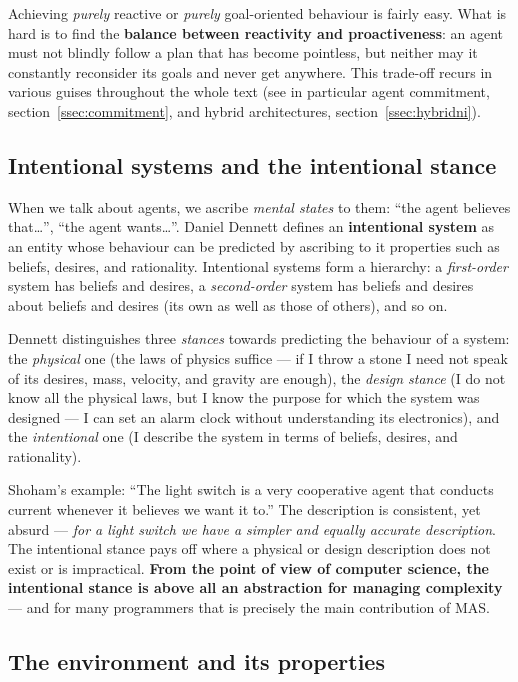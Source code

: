 \documentclass[11pt,a4paper]{article}
\theoremstyle{definition}
\providecommand{\uv}[1]{``#1''}
\begin{document}
Achieving \emph{purely} reactive or \emph{purely} goal-oriented behaviour is fairly easy. What is
hard is to find the \textbf{balance between reactivity and proactiveness}: an agent must not
blindly follow a plan that has become pointless, but neither may it constantly reconsider its
goals and never get anywhere. This trade-off recurs in various guises throughout the whole text
(see in particular agent commitment, section~\ref{ssec:commitment}, and hybrid
architectures, section~\ref{ssec:hybridni}).

\subsection{Intentional systems and the intentional stance}

When we talk about agents, we ascribe \emph{mental states} to them: \uv{the agent believes
that\dots}, \uv{the agent wants\dots}. Daniel Dennett defines an \textbf{intentional system} as an
entity whose behaviour can be predicted by ascribing to it properties such as beliefs, desires,
and rationality. Intentional systems form a hierarchy: a \emph{first-order} system has beliefs
and desires, a \emph{second-order} system has beliefs and desires about beliefs and desires (its
own as well as those of others), and so on.

Dennett distinguishes three \emph{stances} towards predicting the behaviour of a system: the
\emph{physical} one (the laws of physics suffice --- if I throw a stone I need not speak of its
desires, mass, velocity, and gravity are enough), the \emph{design stance} (I do not know all the
physical laws, but I know the purpose for which the system was designed --- I can set an alarm
clock without understanding its electronics), and the \emph{intentional} one (I describe the
system in terms of beliefs, desires, and rationality).

Shoham's example: \uv{The light switch is a very cooperative agent that conducts current
whenever it believes we want it to.} The description is consistent, yet absurd ---
\emph{for a light switch we have a simpler and equally accurate description}. The intentional
stance pays off where a physical or design description does not exist or is impractical.
\textbf{From the point of view of computer science, the intentional stance is above all an
abstraction for managing complexity} --- and for many programmers that is precisely the main
contribution of MAS.

\subsection{The environment and its properties}
\end{document}
